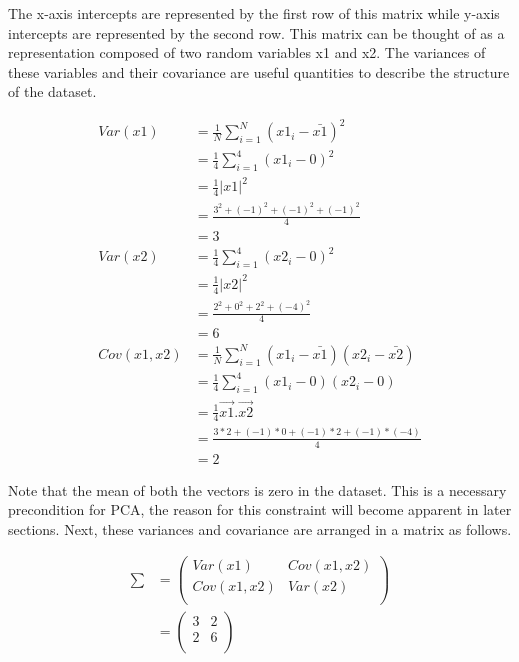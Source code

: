 \documentclass[11pt, a4paper]{article}
\begin{document}
The x-axis intercepts are represented by the first row of this matrix while y-axis intercepts are represented by the second row.
This matrix can be thought of as a representation composed of two random variables x1 and x2. The variances of these variables and their covariance are useful quantities to describe the structure of the dataset.

\begin{align*}
	Var(x1)     & = \frac{1}{N} \sum\limits_{i = 1}^N (x1_i - \bar{x1})^2                \\
	            & = \frac{1}{4} \sum\limits_{i = 1}^4 (x1_i - 0)^2                       \\
	            & = \frac{1}{4} |x1|^2                                                   \\
	            & = \frac{3^2 + (-1)^ 2 + (-1)^2 + (-1)^2}{4}                            \\
	            & = 3                                                                    \\
	Var(x2)     & = \frac{1}{4} \sum\limits_{i = 1}^4 (x2_i - 0)^2                       \\
	            & = \frac{1}{4} |x2|^2                                                   \\
	            & = \frac{2^2 + 0^ 2 + 2^2 + (-4)^2}{4}                                  \\           
	            & = 6                                                                    \\
	Cov(x1, x2) & = \frac{1}{N} \sum\limits_{i = 1}^N (x1_i - \bar{x1})(x2_i - \bar{x2}) \\
	            & = \frac{1}{4} \sum\limits_{i = 1}^4 (x1_i - 0)(x2_i - 0)               \\  
	            & = \frac{1}{4} \vec{x1}.\vec{x2}                                        \\
	            & = \frac{3*2 + (-1)*0 + (-1)*2 + (-1)*(-4)}{4}                          \\
	            & = 2                                                                    
\end{align*}

Note that the mean of both the vectors is zero in the dataset. This is a necessary precondition for PCA, the reason for this constraint will become apparent in later sections. Next, these variances and covariance are arranged in a matrix as follows.

\begin{align*}
	\sum & = \begin{pmatrix} Var(x1) & Cov(x1, x2) \\
	Cov(x1, x2) & Var(x2) \\ 
	\end{pmatrix} \\
	     & = \begin{pmatrix} 3       & 2           \\
	2 & 6 \\ 
	\end{pmatrix}           
\end{align*}
\end{document}
